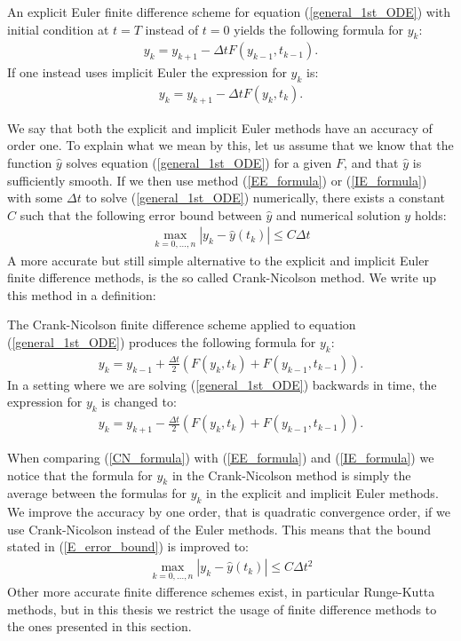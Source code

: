 \begin{definition} \label{Euler_adjoint_def}
An explicit Euler finite difference scheme for equation (\ref{general_1st_ODE}) with initial condition at $t=T$ instead of $t=0$ yields the following formula for $y_k$:
\begin{align}
y_k = y_{k+1} -\Delta tF(y_{k-1},t_{k-1}).\label{EE_adjoint_formula}
\end{align} 
If one instead uses implicit Euler the expression for $y_k$ is:
\begin{align}
y_k = y_{k+1} -\Delta tF(y_{k},t_{k}). \label{IE_adjoint_formula}
\end{align}
\end{definition}
\noindent
We say that both the explicit and implicit Euler methods have an accuracy of order one. To explain what we mean by this, let us assume that we know that the function $\hat y$ solves equation (\ref{general_1st_ODE}) for a given $F$, and that $\hat y$ is sufficiently smooth. If we then use method (\ref{EE_formula}) or (\ref{IE_formula}) with some $\Delta t$ to solve (\ref{general_1st_ODE}) numerically, there exists a constant $C$ such that the  following error bound between $\hat{y}$ and numerical solution $y$ holds:
\begin{align}
\max_{k=0,...,n}|y_k-\hat y(t_k)|\leq C\Delta t \label{E_error_bound}
\end{align}
A more accurate but still simple alternative to the explicit and implicit Euler finite difference methods, is the so called Crank-Nicolson method\cite{crank1947practical}. We write up this method in a definition:
\begin{definition}
The Crank-Nicolson finite difference scheme applied to equation (\ref{general_1st_ODE}) produces the following formula for $y_k$:
\begin{align}
y_k = y_{k-1} +\frac{\Delta t}{2}(F(y_{k},t_{k})+F(y_{k-1},t_{k-1})). \label{CN_formula}
\end{align}
In a setting where we are solving (\ref{general_1st_ODE}) backwards in time, the expression for $y_k$ is changed to: 
\begin{align}
y_k = y_{k+1} -\frac{\Delta t}{2}(F(y_{k},t_{k})+F(y_{k-1},t_{k-1})). \label{CN_adjoint_formula}
\end{align}
\end{definition}
\noindent
When comparing (\ref{CN_formula}) with (\ref{EE_formula}) and (\ref{IE_formula}) we notice that the formula for $y_k$ in the Crank-Nicolson method is simply the average between the formulas for $y_k$ in the explicit and implicit Euler methods. We improve the accuracy by one order, that is quadratic convergence order, if we use Crank-Nicolson instead of the Euler methods. This means that the bound stated in (\ref{E_error_bound}) is improved to:
\begin{align}
\max_{k=0,...,n}|y_k-\hat y(t_k)|\leq C\Delta t^2 \label{CN_error_bound}
\end{align}
Other more accurate finite difference schemes exist, in particular Runge-Kutta methods, but in this thesis we restrict the usage of finite difference methods to the ones presented in this section. 
